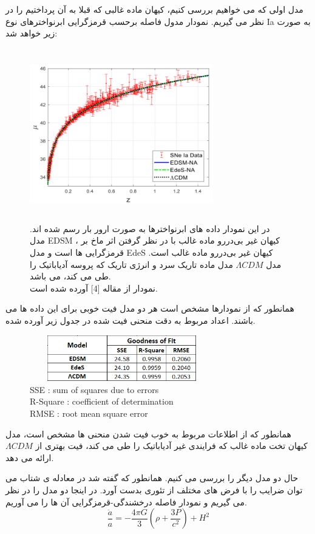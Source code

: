 \documentclass[12pt]{article}
\begin{document}
مدل اولی که می خواهیم بررسی کنیم، کیهان ماده غالبی که قبلا به آن پرداختیم را در نظر می گیریم. نمودار مدول فاصله برحسب قرمزگرایی ابرنواخترهای نوع Ia 
به صورت زیر خواهد شد:
\begin{figure}[H]
\centering
\includegraphics[width=8cm,height=7.5cm]{ax1.png}
\caption*{در این نمودار داده های ابرنواخترها به صورت ارور بار رسم شده اند.
مدل EDSM ، کیهان غیر بی‌دررو ماده غالب با در نظر گرفتن اثر ماخ بر قرمزگرایی ها است و مدل EdeS کیهان غیر بی‌دررو ماده غالب است. مدل $\Lambda CDM$ مدل ماده تاریک سرد و انرژی تاریک که پروسه آدیاباتیک را طی می کند، می باشد.\\
نمودار از مقاله [4] آورده شده است.
}
\end{figure}
همانطور که از نمودارها مشخص است هر دو مدل فیت خوبی برای این داده ها می باشند. اعداد مربوط به دقت منحنی فیت شده در جدول زیر آورده شده.
\begin{figure}[H]
\centering
\includegraphics[width=8cm,height=2cm]{ax3.png}
\begin{LTR}
\caption*{
SSE : sum of squares due to errors\\R-Square : coefficient of determination\\RMSE : root mean square error
}
\end{LTR}
\end{figure}
همانطور که از اطلاعات مربوط به خوب فیت شدن منحنی ها مشخص است، مدل کیهان تخت ماده غالب که فرایندی غیر آدیاباتیک را طی می کند، فیت بهتری از 
$\Lambda CDM$ ارائه می دهد.

حال دو مدل دیگر را بررسی می کنیم. همانطور که گفته شد در معادله ی شتاب می توان ضرایب را با فرض های مختلف از تئوری بدست آورد. در اینجا دو مدل را در نظر می گیریم
و نمودار فاصله درخشندگی-قرمزگرایی آن ها را می آوریم.
\begin{equation}\label{mod1}
\frac{\ddot a}{a}=-\frac{4\pi G}{3}(\rho + \frac{3P}{c^2})+H^2
\end{equation}
\end{document}
